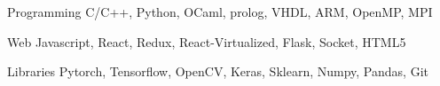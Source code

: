 

\begin{cvskills}

  \cvskill
    {Programming} %
    {C/C++, Python, OCaml, prolog, VHDL, ARM, OpenMP, MPI} %

  \cvskill
    {Web} %
    {Javascript, React, Redux, React-Virtualized, Flask, Socket, HTML5} %

  \cvskill
    {Libraries} %
    {Pytorch, Tensorflow, OpenCV, Keras, Sklearn, Numpy, Pandas, Git} %

\end{cvskills}
